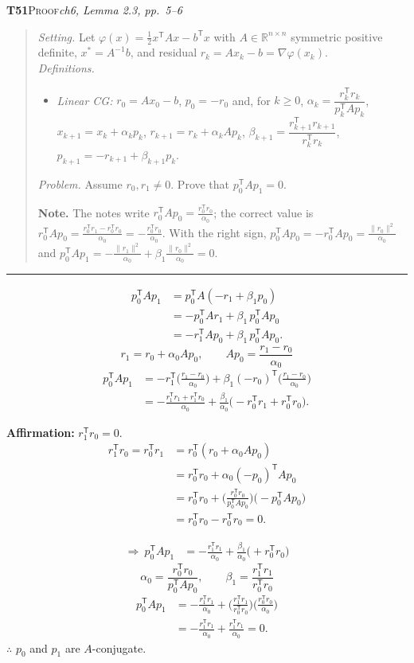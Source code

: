 \documentclass[11pt,a4paper]{article}
\newcommand{\T}{^{\mathsf T}}
\newcommand{\task}[3]{\par\medskip\noindent\textbf{#1}\quad\textsc{#2}\hfill\textit{#3}\par\smallskip}
\newenvironment{statement}{\begin{quote}\small}{\end{quote}\vspace{-0.3em}\noindent\textcolor{gray}{\rule{\linewidth}{0.6pt}}\par\medskip}
\begin{document}
\task{T51}{Proof}{ch6, Lemma 2.3, pp.\ 5--6}
\begin{statement}
\emph{Setting.} Let $\varphi(x)=\tfrac12x\T Ax-b\T x$ with $A\in\mathbb R^{n\times n}$ symmetric positive definite, $x^*=A^{-1}b$, and residual $r_k=Ax_k-b=\nabla\varphi(x_k)$.\\
\emph{Definitions.}
\begin{itemize}
\item \emph{Linear CG:} $r_0=Ax_0-b$, $p_0=-r_0$ and, for $k\ge0$, $\alpha_k=\dfrac{r_k\T r_k}{p_k\T Ap_k}$, $x_{k+1}=x_k+\alpha_kp_k$, $r_{k+1}=r_k+\alpha_kAp_k$, $\beta_{k+1}=\dfrac{r_{k+1}\T r_{k+1}}{r_k\T r_k}$, $p_{k+1}=-r_{k+1}+\beta_{k+1}p_k$.
\end{itemize}
\emph{Problem.} Assume $r_0,r_1\neq0$. Prove that $p_0\T Ap_1=0$.

\textbf{Note.} The notes write $r_0\T Ap_0=\frac{r_0\T r_0}{\alpha_0}$; the correct value is $r_0\T Ap_0=\frac{r_0\T r_1-r_0\T r_0}{\alpha_0}=-\frac{r_0\T r_0}{\alpha_0}$. With the right sign, $p_0\T Ap_0=-r_0\T Ap_0=\frac{\|r_0\|^2}{\alpha_0}$ and $p_0\T Ap_1=-\frac{\|r_1\|^2}{\alpha_0}+\beta_1\frac{\|r_0\|^2}{\alpha_0}=0$.
\end{statement}

\begin{align*}
p_0\T Ap_1&=p_0\T A(-r_1+\beta_1p_0)\\
&=-p_0\T Ar_1+\beta_1\,p_0\T Ap_0\\
&=-r_1\T Ap_0+\beta_1\,p_0\T Ap_0 .
\end{align*}
{\color{green!50!black}
\[
r_1=r_0+\alpha_0Ap_0,\qquad Ap_0=\frac{r_1-r_0}{\alpha_0}
\]}
\begin{align*}
p_0\T Ap_1&=-r_1\T\Big(\frac{r_1-r_0}{\alpha_0}\Big)+\beta_1(-r_0)\T\Big(\frac{r_1-r_0}{\alpha_0}\Big)\\
&=-\frac{r_1\T r_1+r_1\T r_0}{\alpha_0}+\frac{\beta_1}{\alpha_0}\big(-r_0\T r_1+r_0\T r_0\big).
\end{align*}

{\color{orange!85!black}
\textbf{Affirmation:} $r_1\T r_0=0$.
\begin{align*}
r_1\T r_0=r_0\T r_1&=r_0\T(r_0+\alpha_0Ap_0)\\
&=r_0\T r_0+\alpha_0(-p_0)\T Ap_0\\
&=r_0\T r_0+\Big(\frac{r_0\T r_0}{p_0\T Ap_0}\Big)\big(-p_0\T Ap_0\big)\\
&=r_0\T r_0-r_0\T r_0=0 .
\end{align*}}

\begin{align*}
\Rightarrow\ p_0\T Ap_1&=-\frac{r_1\T r_1}{\alpha_0}+\frac{\beta_1}{\alpha_0}\big(+r_0\T r_0\big)
\end{align*}
{\color{green!50!black}
\[
\alpha_0=\frac{r_0\T r_0}{p_0\T Ap_0},\qquad \beta_1=\frac{r_1\T r_1}{r_0\T r_0}
\]}
\begin{align*}
p_0\T Ap_1&=-\frac{r_1\T r_1}{\alpha_0}+\Big(\frac{r_1\T r_1}{r_0\T r_0}\Big)\Big(\frac{r_0\T r_0}{\alpha_0}\Big)\\
&=-\frac{r_1\T r_1}{\alpha_0}+\frac{r_1\T r_1}{\alpha_0}=0 .
\end{align*}
$\therefore$ $p_0$ and $p_1$ are $A$-conjugate.
\end{document}
